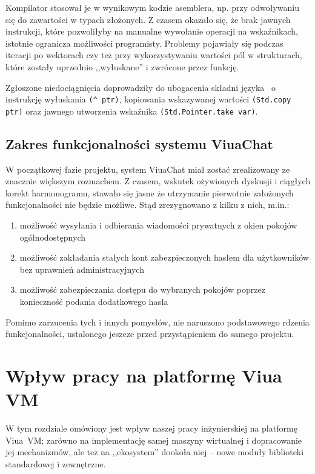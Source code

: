 Kompilator stosował je w wynikowym kodzie asemblera, np. przy odwoływaniu się do
zawartości w typach złożonych. Z czasem okazało się, że brak jawnych instrukcji,
które pozwoliłyby na manualne wywołanie operacji na wskaźnikach, istotnie
ogranicza możliwości programisty. Problemy pojawiały się podczas iteracji po
wektorach czy też przy wykorzystywaniu wartości pól w strukturach, które zostały
uprzednio ,,wyłuskane'' i zwrócone przez funkcję.

Zgłoszone niedociągnięcia doprowadziły do ubogacenia składni języka \ViuAct\ o
instrukcję wyłuskania \texttt{(\^~ptr)}, kopiowania wskazywanej wartości
\texttt{(Std.copy ptr)} oraz jawnego utworzenia wskaźnika
\texttt{(Std.Pointer.take var)}.

\subsection{Zakres funkcjonalności systemu ViuaChat}

W początkowej fazie projektu, system ViuaChat miał zostać zrealizowany ze
znacznie większym rozmachem. Z czasem, wskutek ożywionych dyskusji i ciągłych
korekt harmonogramu, stawało się jasne że utrzymanie pierwotnie założonych
funkcjonalności nie będzie możliwe. Stąd zrezygnowano z kilku z nich, m.in.:

\begin{enumerate}
    \item możliwość wysyłania i odbierania wiadomości prywatnych z okien pokojów
        ogólnodostępnych
    \item możliwość zakładania stałych kont zabezpieczonych hasłem dla
        użytkowników bez uprawnień administracyjnych
    \item możliwość zabezpieczania dostępu do wybranych pokojów poprzez
        konieczność podania dodatkowego hasła
\end{enumerate}

Pomimo zarzucenia tych i innych pomysłów, nie naruszono podstawowego rdzenia
funkcjonalności, ustalonego jeszcze przed przystąpieniem do samego projektu.

\section{Wpływ pracy na platformę Viua VM}

W tym rozdziale omówiony jest wpływ naszej pracy inżynierskiej na platformę
Viua~VM; zarówno na implementację samej maszyny wirtualnej i dopracowanie jej
mechanizmów, ale też na ,,ekosystem'' dookoła niej -- nowe moduły biblioteki
standardowej i zewnętrzne.

